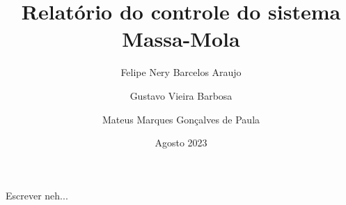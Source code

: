 \documentclass[12pt,a4paper]{article}
\title{Relatório do controle do sistema Massa-Mola}
\author{
  Felipe Nery Barcelos Araujo\\
  \and
  Gustavo Vieira Barbosa\\
  \and
  Mateus Marques Gonçalves de Paula\\
}
\date{Agosto 2023}
\begin{document}

\maketitle

Escrever neh...
\end{document}
